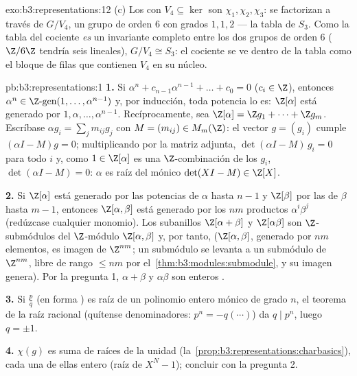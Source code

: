 \begin{solution}{exo:b3:representations:12}
(c) Los  con
$V_4 \subseteq \ker$ son $\chi_1,
\chi_2, \chi_3$: se factorizan a través de $G/V_4$, un grupo de orden
$6$ con grados 
$1, 1, 2$ --- la tabla de $S_3$. Como la tabla del cociente \emph{es} un
invariante completo entre los dos grupos de orden $6$ ($\Z/6\Z$ tendría
seis  lineales),
$G/V_4 \cong
S_3$: el cociente se ve dentro de la tabla como el bloque de filas que
contienen $V_4$ en su núcleo.
\end{solution}

\begin{solution}{pb:b3:representations:1}
\textbf{1.} Si $\alpha^n + c_{n-1}\alpha^{n-1} + \dots + c_0 =
0$ ($c_i \in \Z$), entonces $\alpha^n \in \Z\text{-gen}(1, \dots,
\alpha^{n-1})$ y, por inducción, toda potencia lo es: $\Z[\alpha]$ está
generado por $1, \alpha, \dots, \alpha^{n-1}$. Recíprocamente, sea
$\Z[\alpha] = \Z g_1 + \dots + \Z g_m$. Escríbase $\alpha g_i =
\sum_j m_{ij}g_j$ con $M = (m_{ij}) \in M_m(\Z)$: el vector $g = (g_i)$
cumple $(\alpha I - M)g = 0$; multiplicando por la matriz adjunta,
$\det(\alpha I - M)\,g_i = 0$ para todo $i$ y, como $1 \in \Z[\alpha]$
es una $\Z$-combinación de los $g_i$, $\det(\alpha I - M) = 0$: $\alpha$
es raíz del mónico $\det(XI - M) \in \Z[X]$.

\textbf{2.} Si $\Z[\alpha]$ está generado por las potencias de $\alpha$
hasta $n-1$ y $\Z[\beta]$ por las de $\beta$ hasta $m - 1$, entonces
$\Z[\alpha,\beta]$ está generado por los $nm$ productos
$\alpha^i\beta^j$ (redúzcase cualquier monomio). Los subanillos
$\Z[\alpha + \beta]$ y $\Z[\alpha\beta]$ son $\Z$-submódulos del
$\Z$-módulo 
$\Z[\alpha, \beta]$ y, por tanto,
 ($\Z[\alpha,\beta]$,
generado por $nm$ elementos, es imagen de $\Z^{nm}$; un submódulo se
levanta a un submódulo de $\Z^{nm}$, libre de rango $\leq nm$ por
el~\cref{thm:b3:modules:submodule}, y su imagen genera). Por la pregunta
1, $\alpha + \beta$ y $\alpha\beta$ son enteros
.

\textbf{3.} Si $\frac pq$ (en forma ) es raíz de un polinomio
entero mónico de grado $n$, el teorema de la raíz racional (quítense
denominadores: $p^n = -q(\cdots)$) da $q \mid p^n$, luego $q = \pm1$.

\textbf{4.} $\chi(g)$ es suma de raíces de la unidad
(la~\cref{prop:b3:representations:charbasics}), cada una de ellas entero
 (raíz de $X^N - 1$);
concluir con la pregunta 2.


\end{solution}
